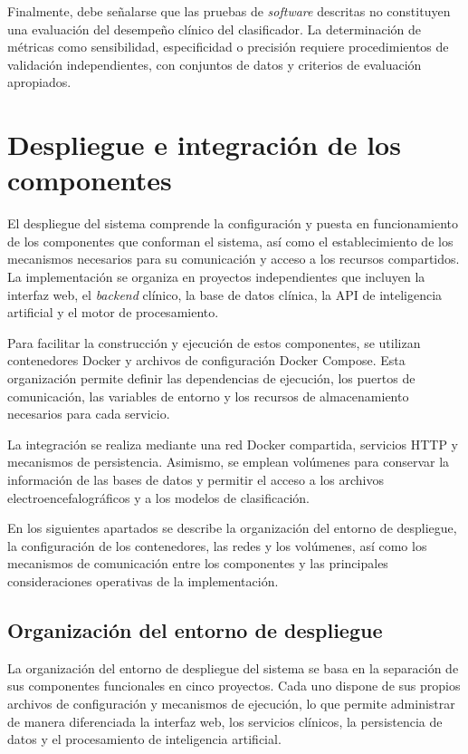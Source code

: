 Finalmente, debe señalarse que las pruebas de \textit{software}
descritas no constituyen una evaluación del desempeño
clínico del clasificador. La determinación de métricas
como sensibilidad, especificidad o precisión requiere
procedimientos de validación independientes, con
conjuntos de datos y criterios de evaluación apropiados.


\section{Despliegue e integración de los componentes}

El despliegue del sistema comprende la configuración y puesta en
funcionamiento de los componentes que conforman el sistema, así
como el establecimiento de los mecanismos necesarios para su
comunicación y acceso a los recursos compartidos. La implementación
se organiza en proyectos independientes que incluyen la interfaz
web, el \textit{backend} clínico, la base de datos clínica, la API de
inteligencia artificial y el motor de procesamiento.

Para facilitar la construcción y ejecución de estos componentes,
se utilizan contenedores Docker y archivos de configuración
Docker Compose. Esta organización permite definir las dependencias
de ejecución, los puertos de comunicación, las variables de
entorno y los recursos de almacenamiento necesarios para cada
servicio.

La integración se realiza mediante una red Docker compartida,
servicios HTTP y mecanismos de persistencia. Asimismo, se
emplean volúmenes para conservar la información de las bases
de datos y permitir el acceso a los archivos electroencefalográficos
y a los modelos de clasificación.

En los siguientes apartados se describe la organización del
entorno de despliegue, la configuración de los contenedores,
las redes y los volúmenes, así como los mecanismos de
comunicación entre los componentes y las principales
consideraciones operativas de la implementación.

\subsection{Organización del entorno de despliegue}

La organización del entorno de despliegue del sistema se basa
en la separación de sus componentes funcionales en cinco
proyectos. Cada uno dispone de sus propios archivos de
configuración y mecanismos de ejecución, lo que permite
administrar de manera diferenciada la interfaz web, los
servicios clínicos, la persistencia de datos y el procesamiento
de inteligencia artificial.

